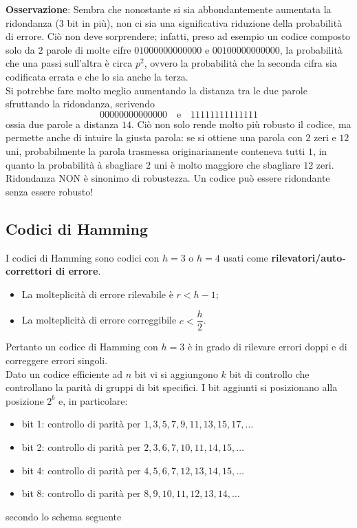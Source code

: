 \documentclass[a4paper]{extarticle}
\begin{document}
\vspace{1em}
\noindent
\textbf{Osservazione}: Sembra che nonostante si sia abbondantemente aumentata la ridondanza ($3$ bit in più), non ci sia una significativa riduzione della probabilità di errore. Ciò non deve sorprendere; infatti, preso ad esempio un codice composto solo da $2$ parole di molte cifre $01000000000000$ e $00100000000000$, la probabilità che una passi sull'altra è circa $p^2$, ovvero la probabilità che la seconda cifra sia codificata errata e che lo sia anche la terza.\\
Si potrebbe fare molto meglio aumentando la distanza tra le due parole sfruttando la ridondanza, scrivendo
\[00000000000000 \hspace{1em} \text{e} \hspace{1em} 11111111111111\]
ossia due parole a distanza $14$. Ciò non solo rende molto più robusto il codice, ma permette anche di intuire la giusta parola: se si ottiene una parola con $2$ zeri e $12$ uni, probabilmente la parola trasmessa originariamente conteneva tutti $1$, in quanto la probabilità à sbagliare $2$ uni è molto maggiore che sbagliare $12$ zeri.\\
Ridondanza NON è sinonimo di robustezza. Un codice può essere ridondante senza essere robusto!

\vspace{1em}
\subsection{Codici di Hamming}
I codici di Hamming sono codici con $h=3$ o $h=4$ usati come \textbf{rilevatori/auto-correttori di errore}.
\begin{itemize}
    \item La molteplicità di errore rilevabile è $r<h-1$;
    \item La molteplicità di errore correggibile $c<\dfrac{h}{2}$.
\end{itemize}
Pertanto un codice di Hamming con $h=3$ è in grado di rilevare errori doppi e di correggere errori singoli.\\
Dato un codice efficiente ad $n$ bit vi si aggiungono $k$ bit di controllo che controllano la parità di gruppi di bit specifici. I bit aggiunti si posizionano alla posizione $2^b$ e, in particolare:
\begin{itemize}
    \item bit 1: controllo di parità per $1,3,5,7,9,11,13,15,17,\dots$
    \item bit 2: controllo di parità per $2,3,6,7,10,11,14,15,\dots$
    \item bit 4: controllo di parità per $4,5,6,7,12,13,14,15,\dots$
    \item bit 8: controllo di parità per $8,9,10,11,12,13,14,\dots$
\end{itemize}
secondo lo schema seguente
\end{document}
